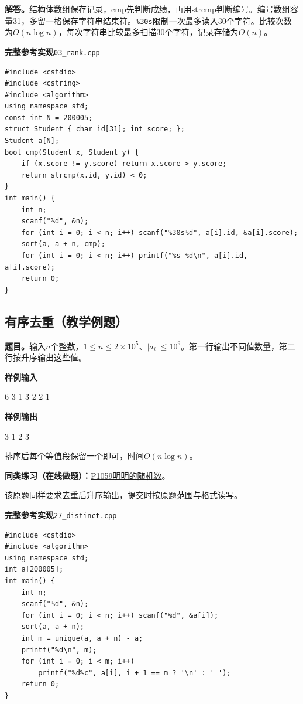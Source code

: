\documentclass[UTF8,11pt,a4paper,fontset=none]{ctexart}
\newcommand{\practice}[2]{\par\noindent\textbf{同类练习（在线做题）：}\href{https://www.luogu.com.cn/problem/#1}{#1\quad #2}。\par}
\begin{document}
\noindent\textbf{解答。}结构体数组保存记录，cmp先判断成绩，再用strcmp判断编号。编号数组容量31，多留一格保存字符串结束符。\texttt{\%30s}限制一次最多读入30个字符。比较次数为$O(n\log n)$，每次字符串比较最多扫描30个字符，记录存储为$O(n)$。
\par\noindent\begin{minipage}{\linewidth}
\textbf{完整参考实现}\quad\texttt{03\_rank.cpp}
\begin{lstlisting}
#include <cstdio>
#include <cstring>
#include <algorithm>
using namespace std;
const int N = 200005;
struct Student { char id[31]; int score; };
Student a[N];
bool cmp(Student x, Student y) {
    if (x.score != y.score) return x.score > y.score;
    return strcmp(x.id, y.id) < 0;
}
int main() {
    int n;
    scanf("%d", &n);
    for (int i = 0; i < n; i++) scanf("%30s%d", a[i].id, &a[i].score);
    sort(a, a + n, cmp);
    for (int i = 0; i < n; i++) printf("%s %d\n", a[i].id, a[i].score);
    return 0;
}
\end{lstlisting}
\end{minipage}\par

\subsection{有序去重（教学例题）}

\noindent\textbf{题目。}输入$n$个整数，$1\le n\le2\times10^5$、$|a_i|\le10^9$。第一行输出不同值数量，第二行按升序输出这些值。
\begin{tcolorbox}[samplebox,title={输入输出样例}]
\textbf{样例输入}
\begin{Sample}
6
3 1 3 2 2 1
\end{Sample}
\tcblower
\textbf{样例输出}
\begin{Sample}
3
1 2 3
\end{Sample}
\end{tcolorbox}
排序后每个等值段保留一个即可，时间$O(n\log n)$。
\practice{P1059}{明明的随机数}
该原题同样要求去重后升序输出，提交时按原题范围与格式读写。
\par\noindent\begin{minipage}{\linewidth}
\textbf{完整参考实现}\quad\texttt{27\_distinct.cpp}
\begin{lstlisting}
#include <cstdio>
#include <algorithm>
using namespace std;
int a[200005];
int main() {
    int n;
    scanf("%d", &n);
    for (int i = 0; i < n; i++) scanf("%d", &a[i]);
    sort(a, a + n);
    int m = unique(a, a + n) - a;
    printf("%d\n", m);
    for (int i = 0; i < m; i++)
        printf("%d%c", a[i], i + 1 == m ? '\n' : ' ');
    return 0;
}
\end{lstlisting}
\end{minipage}\par
\end{document}
